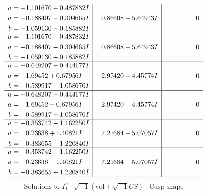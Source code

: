 \documentclass[1p]{elsarticle_modified}
\theoremstyle{definition}
\newcommand{\I}{\sqrt{-1}}
\begin{document}
$$\begin{array}{c|c|c}
\begin{aligned}
u &= -1.101670 + 0.487832 I \\
a &= -0.188407 - 0.304665 I \\
b &= -1.059130 - 0.185882 I\end{aligned}
 & \phantom{-}0.86608 + 5.64943 I & \phantom{-0.000000 } 0 \\ \hline\begin{aligned}
u &= -1.101670 - 0.487832 I \\
a &= -0.188407 + 0.304665 I \\
b &= -1.059130 + 0.185882 I\end{aligned}
 & \phantom{-}0.86608 - 5.64943 I & \phantom{-0.000000 } 0 \\ \hline\begin{aligned}
u &= -0.648207 + 0.444177 I \\
a &= \phantom{-}1.69452 + 0.67956 I \\
b &= \phantom{-}0.589917 - 1.058670 I\end{aligned}
 & \phantom{-}2.97420 - 4.45774 I & \phantom{-0.000000 } 0 \\ \hline\begin{aligned}
u &= -0.648207 - 0.444177 I \\
a &= \phantom{-}1.69452 - 0.67956 I \\
b &= \phantom{-}0.589917 + 1.058670 I\end{aligned}
 & \phantom{-}2.97420 + 4.45774 I & \phantom{-0.000000 } 0 \\ \hline\begin{aligned}
u &= -0.353742 + 1.162250 I \\
a &= \phantom{-}0.23638 + 1.40821 I \\
b &= -0.383655 - 1.220840 I\end{aligned}
 & \phantom{-}7.21684 - 5.07057 I & \phantom{-0.000000 } 0 \\ \hline\begin{aligned}
u &= -0.353742 - 1.162250 I \\
a &= \phantom{-}0.23638 - 1.40821 I \\
b &= -0.383655 + 1.220840 I\end{aligned}
 & \phantom{-}7.21684 + 5.07057 I & \phantom{-0.000000 } 0\\
 \hline 
 \end{array}$$\newpage$$\begin{array}{c|c|c}  
\text{Solutions to }I^u_{1}& \I (\text{vol} + \sqrt{-1}CS) & \text{Cusp shape}\\
 \hline 
\begin{aligned}

\end{aligned}
\end{array}$$
\end{document}
